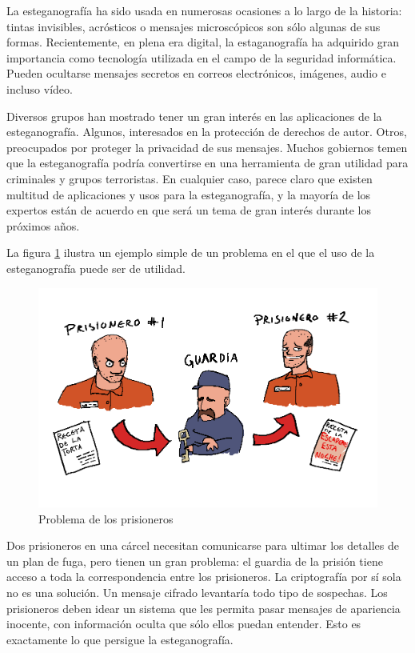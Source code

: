 \documentclass[12pt]{article}
\begin{document}
La esteganografía ha sido usada en numerosas ocasiones a lo largo de la historia: tintas invisibles, acrósticos o mensajes microscópicos son sólo algunas de sus formas. Recientemente, en plena era digital, la estaganografía ha adquirido gran importancia como tecnología utilizada en el campo de la seguridad informática. Pueden ocultarse mensajes secretos en correos electrónicos, imágenes, audio e incluso vídeo.

Diversos grupos han mostrado tener un gran interés en las aplicaciones de la esteganografía. Algunos, interesados en la protección de derechos de autor. Otros, preocupados por proteger la privacidad de sus mensajes. Muchos gobiernos temen que la esteganografía podría convertirse en una herramienta de gran utilidad para criminales y grupos terroristas. En cualquier caso, parece claro que existen multitud de aplicaciones y usos para la esteganografía, y la mayoría de los expertos están de acuerdo en que será un tema de gran interés durante los próximos años.

La figura \ref{prisioneros} ilustra un ejemplo simple de un problema en el que el uso de la esteganografía puede ser de utilidad.

\begin{figure}[h]
  \centering
    \includegraphics[width=\textwidth]{img/illustration2}
  \caption{Problema de los prisioneros}
  \label{prisioneros}
\end{figure}

Dos prisioneros en una cárcel necesitan comunicarse para ultimar los detalles de un plan de fuga, pero tienen un gran problema: el guardia de la prisión tiene acceso a toda la correspondencia entre los prisioneros. La criptografía por sí sola no es una solución. Un mensaje cifrado levantaría todo tipo de sospechas. Los prisioneros deben idear un sistema que les permita pasar mensajes de apariencia inocente, con información oculta que sólo ellos puedan entender. Esto es exactamente lo que persigue la esteganografía.
\end{document}
